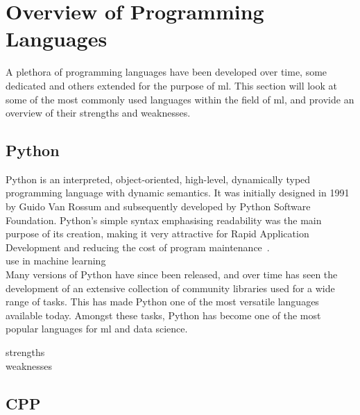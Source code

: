 
\section{Overview of Programming Languages}

A plethora of programming languages have been developed over time, some dedicated and others extended for the purpose of \gls{ml}.
This section will look at some of the most 
commonly used languages within the field of \gls{ml}, and provide an overview of their strengths and weaknesses.

\subsection{Python}

Python is an interpreted, object-oriented, high-level, dynamically typed programming language with dynamic semantics. It was initially designed in 1991 by Guido Van Rossum and subsequently
developed by Python Software Foundation. Python's simple syntax emphasising readability was the main purpose of its creation, making it very attractive for Rapid Application Development and reducing
the cost of program maintenance~\citep{whatispython}.\\

use in machine learning\\

Many versions of Python have since been released, and over time has seen the development of an extensive collection of community libraries used for a wide range of tasks. This
has made Python one of the most versatile languages available today. Amongst these tasks, Python has become one of the most popular languages for \gls{ml} and data science.


strengths\\

weaknesses\\

\subsection{CPP}

